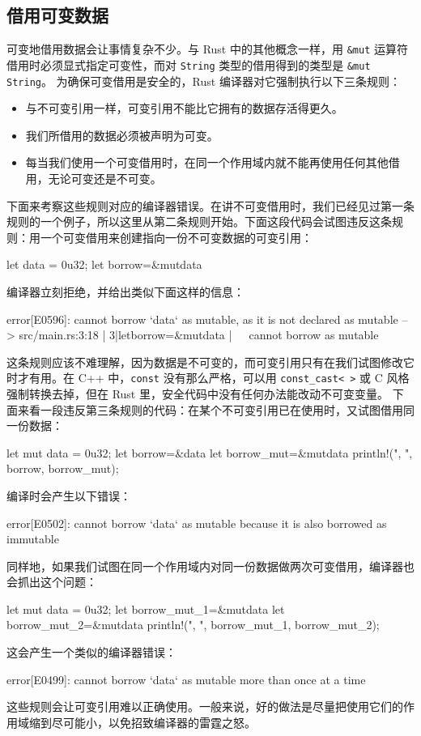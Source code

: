\subsection{借用可变数据}
\label{idx:idx_efa1d5cc}
可变地借用数据会让事情复杂不少。与 Rust 中的其他概念一样，用 \texttt{\&mut} 运算符借用时必须显式指定可变性，而对 \texttt{String} 类型的借用得到的类型是 \texttt{\&\allowbreak{}mut String}。
为确保可变借用是安全的，Rust 编译器对它强制执行以下三条规则：
\begin{itemize}
  \item 与不可变引用一样，可变引用不能比它拥有的数据存活得更久。
  \item 我们所借用的数据必须被声明为可变。
  \item 每当我们使用一个可变借用时，在同一个作用域内就不能再使用任何其他借用，无论可变还是不可变。
\end{itemize}
下面来考察这些规则对应的编译器错误。在讲不可变借用时，我们已经见过第一条规则的一个例子，所以这里从第二条规则开始。下面这段代码会试图违反这条规则：用一个可变借用来创建指向一份不可变数据的可变引用：
\begin{codebox}[rust]
let data = 0u32;
let borrow=&mutdata
\end{codebox}
编译器立刻拒绝，并给出类似下面这样的信息：
\begin{codebox}[rust]
error[E0596]: cannot borrow `data` as mutable, as it is not declared as mutable
 --> src/main.rs:3:18
  |
3|letborrow=&mutdata
  |                  ^^^^^^^^^ cannot borrow as mutable
\end{codebox}
\label{idx:idx_2611dffd}
这条规则应该不难理解，因为数据是不可变的，而可变引用只有在我们试图修改它时才有用。在 C++ 中，\texttt{const} 没有那么严格，可以用 \texttt{const\_\allowbreak{}cast<\allowbreak{} >\allowbreak{}} 或 C 风格强制转换去掉，但在 Rust 里，安全代码中没有任何办法能改动不可变变量。
下面来看一段违反第三条规则的代码：在某个不可变引用已在使用时，又试图借用同一份数据：
\begin{codebox}[rust]
let mut data = 0u32;
let borrow=&data
let borrow_mut=&mutdata
println!("{}, {}", borrow, borrow_mut);
\end{codebox}
编译时会产生以下错误：
\begin{codeboxdark}
error[E0502]: cannot borrow `data` as mutable because it is also borrowed as
immutable
\end{codeboxdark}
同样地，如果我们试图在同一个作用域内对同一份数据做两次可变借用，编译器也会抓出这个问题：
\begin{codebox}[rust]
let mut data = 0u32;
let borrow_mut_1=&mutdata
let borrow_mut_2=&mutdata
println!("{}, {}", borrow_mut_1, borrow_mut_2);
\end{codebox}
这会产生一个类似的编译器错误：
\begin{codeboxdark}
error[E0499]: cannot borrow `data` as mutable more than once at a time
\end{codeboxdark}
\label{idx:idx_a02592ca}
这些规则会让可变引用难以正确使用。一般来说，好的做法是尽量把使用它们的作用域缩到尽可能小，以免招致编译器的雷霆之怒。
